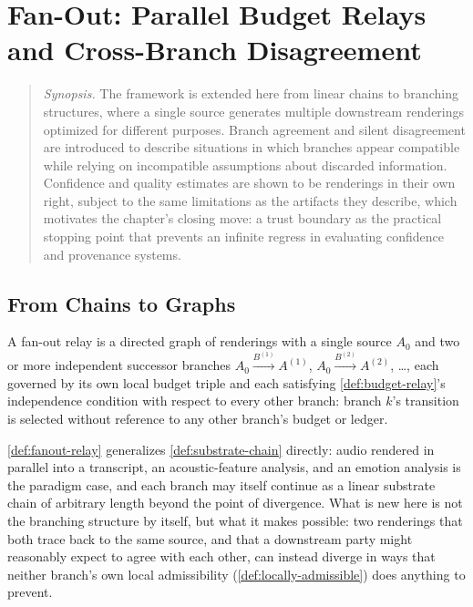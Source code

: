 \chapter{Fan-Out: Parallel Budget Relays and Cross-Branch Disagreement}
\label{ch:fanout}

\begin{quotation}
\noindent\textit{Synopsis.} The framework is extended here from linear
chains to branching structures, where a single source generates multiple
downstream renderings optimized for different purposes. Branch agreement
and silent disagreement are introduced to describe situations in which
branches appear compatible while relying on incompatible assumptions about
discarded information. Confidence and quality estimates are shown to be
renderings in their own right, subject to the same limitations as the
artifacts they describe, which motivates the chapter's closing move: a
trust boundary as the practical stopping point that prevents an infinite
regress in evaluating confidence and provenance systems.
\end{quotation}

\section{From Chains to Graphs}

\begin{definition}
\label{def:fanout-relay}
A fan-out relay is a directed graph of renderings with a single source
$A_0$ and two or more independent successor branches
$A_0 \xrightarrow{B^{(1)}} A^{(1)}$, $A_0 \xrightarrow{B^{(2)}} A^{(2)}$,
\ldots, each governed by its own local budget triple and each satisfying
\cref{def:budget-relay}'s independence condition with respect to every
other branch: branch $k$'s transition is selected without reference to
any other branch's budget or ledger.
\end{definition}

\cref{def:fanout-relay} generalizes \cref{def:substrate-chain} directly:
audio rendered in parallel into a transcript, an acoustic-feature
analysis, and an emotion analysis is the paradigm case, and each branch
may itself continue as a linear substrate chain of arbitrary length
beyond the point of divergence. What is new here is not the branching
structure by itself, but what it makes possible: two renderings that
both trace back to the same source, and that a downstream party might
reasonably expect to agree with each other, can instead diverge in ways
that neither branch's own local admissibility (\cref{def:locally-admissible})
does anything to prevent.

